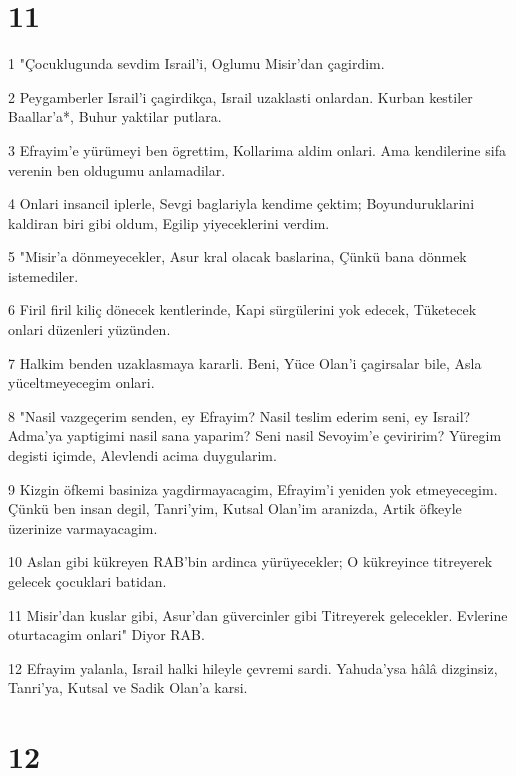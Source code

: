 \chapter{11}

\par 1 "Çocuklugunda sevdim Israil'i, Oglumu Misir'dan çagirdim.
\par 2 Peygamberler Israil'i çagirdikça, Israil uzaklasti onlardan. Kurban kestiler Baallar'a*, Buhur yaktilar putlara.
\par 3 Efrayim'e yürümeyi ben ögrettim, Kollarima aldim onlari. Ama kendilerine sifa verenin ben oldugumu anlamadilar.
\par 4 Onlari insancil iplerle, Sevgi baglariyla kendime çektim; Boyunduruklarini kaldiran biri gibi oldum, Egilip yiyeceklerini verdim.
\par 5 "Misir'a dönmeyecekler, Asur kral olacak baslarina, Çünkü bana dönmek istemediler.
\par 6 Firil firil kiliç dönecek kentlerinde, Kapi sürgülerini yok edecek, Tüketecek onlari düzenleri yüzünden.
\par 7 Halkim benden uzaklasmaya kararli. Beni, Yüce Olan'i çagirsalar bile, Asla yüceltmeyecegim onlari.
\par 8 "Nasil vazgeçerim senden, ey Efrayim? Nasil teslim ederim seni, ey Israil? Adma'ya yaptigimi nasil sana yaparim? Seni nasil Sevoyim'e çeviririm? Yüregim degisti içimde, Alevlendi acima duygularim.
\par 9 Kizgin öfkemi basiniza yagdirmayacagim, Efrayim'i yeniden yok etmeyecegim. Çünkü ben insan degil, Tanri'yim, Kutsal Olan'im aranizda, Artik öfkeyle üzerinize varmayacagim.
\par 10 Aslan gibi kükreyen RAB'bin ardinca yürüyecekler; O kükreyince titreyerek gelecek çocuklari batidan.
\par 11 Misir'dan kuslar gibi, Asur'dan güvercinler gibi Titreyerek gelecekler. Evlerine oturtacagim onlari" Diyor RAB.
\par 12 Efrayim yalanla, Israil halki hileyle çevremi sardi. Yahuda'ysa hâlâ dizginsiz, Tanri'ya, Kutsal ve Sadik Olan'a karsi.

\chapter{12}

